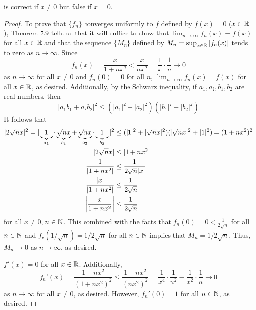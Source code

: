 \documentclass[../psets.tex]{subfiles}
\begin{document}
\begin{enumerate}[label={\textbf{\arabic*.}}]
\begin{equation*}
    \end{equation*}
    is correct if $x\neq 0$ but false if $x=0$.
    \begin{proof}
        To prove that $\{f_n\}$ converges uniformly to $f$ defined by $f(x)=0$ ($x\in\mathbb{R}$), Theorem 7.9 tells us that it will suffice to show that $\lim_{n\to\infty}f_n(x)=f(x)$ for all $x\in\mathbb{R}$ and that the sequence $\{M_n\}$ defined by $M_n=\sup_{x\in\mathbb{R}}|f_n(x)|$ tends to zero as $n\to\infty$.  Since
        \begin{equation*}
            f_n(x) = \frac{x}{1+nx^2} < \frac{x}{nx^2} = \frac{1}{x}\cdot\frac{1}{n} \to 0
        \end{equation*}
        as $n\to\infty$ for all $x\neq 0$ and $f_n(0)=0$ for all $n$, $\lim_{n\to\infty}f_n(x)=f(x)$ for all $x\in\mathbb{R}$, as desired. Additionally, by the Schwarz inequality, if $a_1,a_2,b_1,b_2$ are real numbers, then
        \begin{equation*}
            |a_1b_1+a_2b_2|^2 \leq (|a_1|^2+|a_2|^2)(|b_1|^2+|b_2|^2)
        \end{equation*}
        It follows that
        \begin{align*}
            |2\sqrt{n}x|^2 = |\underbrace{1\vphantom{\sqrt{n}x}}_{a_1}\cdot\underbrace{\sqrt{n}x}_{b_1}+\underbrace{\sqrt{n}x}_{a_2}\cdot\underbrace{1\vphantom{\sqrt{n}x}}_{b_2}|^2 &\leq (|1|^2+|\sqrt{n}x|^2)(|\sqrt{n}x|^2+|1|^2) = (1+nx^2)^2\\
            |2\sqrt{n}x| &\leq |1+nx^2|\\
            \frac{1}{|1+nx^2|} &\leq \frac{1}{2\sqrt{n}|x|}\\
            \frac{|x|}{|1+nx^2|} &\leq \frac{1}{2\sqrt{n}}\\
            \left| \frac{x}{1+nx^2} \right| &\leq \frac{1}{2\sqrt{n}}
        \end{align*}
        for all $x\neq 0$, $n\in\mathbb{N}$. This combined with the facts that $f_n(0)=0<\tfrac{1}{2\sqrt{n}}$ for all $n\in\mathbb{N}$ and $f_n(1/\sqrt{n})=1/2\sqrt{n}$ for all $n\in\mathbb{N}$ implies that $M_n=1/2\sqrt{n}$. Thus, $M_n\to 0$ as $n\to\infty$, as desired.\par
        $f'(x)=0$ for all $x\in\mathbb{R}$. Additionally,
        \begin{equation*}
            f_n'(x) = \frac{1-nx^2}{(1+nx^2)^2}
            \leq \frac{1-nx^2}{(nx^2)^2}
            = \frac{1}{x^4}\cdot\frac{1}{n^2}-\frac{1}{x^2}\cdot\frac{1}{n} \to 0
        \end{equation*}
        as $n\to\infty$ for all $x\neq 0$, as desired. However, $f_n'(0)=1$ for all $n\in\mathbb{N}$, as desired.
    \end{proof}
\end{enumerate}
\end{document}

